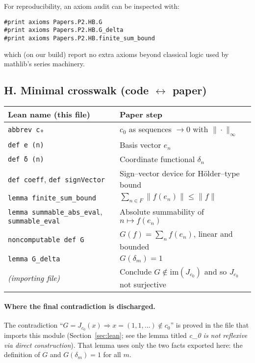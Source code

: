 \documentclass[11pt]{article}
\begin{document}
For reproducibility, an axiom audit can be inspected with:
\begin{lstlisting}[language={},numbers=none]
#print axioms Papers.P2.HB.G
#print axioms Papers.P2.HB.G_delta
#print axioms Papers.P2.HB.finite_sum_bound
\end{lstlisting}
which (on our build) report no extra axioms beyond classical logic used by mathlib's series machinery.

\subsection*{H. Minimal crosswalk (code $\leftrightarrow$ paper)}

\begin{center}
\begin{tabular}{@{}p{} p{}@{}}
\toprule
\textbf{Lean name (this file)} & \textbf{Paper step} \\
\midrule
\verb|abbrev c₀| & $c_0$ as sequences $\to 0$ with $\|\cdot\|_\infty$ \\
\verb|def e (n)| & Basis vector $e_n$ \\
\verb|def δ (n)| & Coordinate functional $\delta_n$ \\
\verb|def coeff|, \verb|def signVector| & Sign--vector device for Hölder--type bound \\
\verb|lemma finite_sum_bound| & $\sum_{n\in F}\|f(e_n)\|\le \|f\|$ \\
\verb|lemma summable_abs_eval|, \verb|summable_eval| & Absolute summability of $n\mapsto f(e_n)$ \\
\verb|noncomputable def G| & $G(f)=\sum_n f(e_n)$, linear and bounded \\
\verb|lemma G_delta| & $G(\delta_m)=1$ \\
\textit{(importing file)} & Conclude $G\notin \mathrm{im}(J_{c_0})$ and so $J_{c_0}$ not surjective \\
\bottomrule
\end{tabular}
\end{center}

\paragraph{Where the final contradiction is discharged.}
The contradiction ``$G=J_{c_0}(x)\Rightarrow x=(1,1,\dots)\notin c_0$'' is proved in the file that imports this module (Section~\ref{sec:lean}; see the lemma titled \emph{c_0 is not reflexive via direct construction}). That lemma uses only the two facts exported here: the definition of $G$ and $G(\delta_m)=1$ for all $m$.
\end{document}
